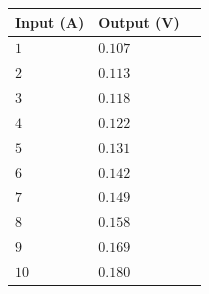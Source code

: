 \begin{table}[H]
\begin{tabular}{|l|l|l|}
\hline%
  \textbf{Input (A)}  & \textbf{Output (V)}  \\
\hline%
  $1$                 &            $0.107$    \\
\hline%
  $2$                 &            $0.113$    \\
\hline%
  $3$                 &            $0.118$    \\
\hline%
  $4$                 &            $0.122$    \\
\hline%
  $5$                 &            $0.131$    \\
\hline%
  $6$                 &            $0.142$    \\
\hline%
  $7$                 &            $0.149$    \\
\hline%
  $8$                 &            $0.158$    \\
\hline%
  $9$                 &            $0.169$    \\
\hline%
  $10$                &            $0.180$    \\
\hline%
\end{tabular}
\end{table}